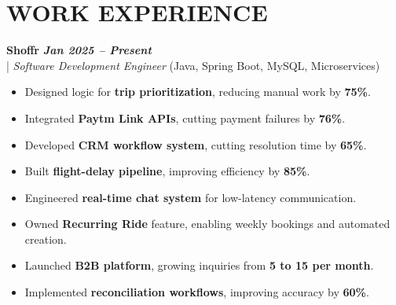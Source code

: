 \documentclass[10pt,a4paper]{article}
\begin{document}
\section*{WORK EXPERIENCE}
\small

\noindent
  \textbf{Shoffr} \hfill \textit{\textbf{Jan 2025 -- Present}} \\
  \;|\;
  \textit{Software Development Engineer} (Java, Spring Boot, MySQL, Microservices)
\begin{itemize}



\item Designed logic for \textbf{trip prioritization}, reducing manual work by \textbf{75\%}.



\item Integrated \textbf{Paytm Link APIs}, cutting payment failures by \textbf{76\%}.



\item Developed \textbf{CRM workflow system}, cutting resolution time by \textbf{65\%}.



\item Built \textbf{flight-delay pipeline}, improving efficiency by \textbf{85\%}.



\item Engineered \textbf{real-time chat system} for low-latency communication.



\item Owned \textbf{Recurring Ride} feature, enabling weekly bookings and automated creation.



\item Launched \textbf{B2B platform}, growing inquiries from \textbf{5 to 15 per month}.



\item Implemented \textbf{reconciliation workflows}, improving accuracy by \textbf{60\%}.



\end{itemize}
\end{document}
